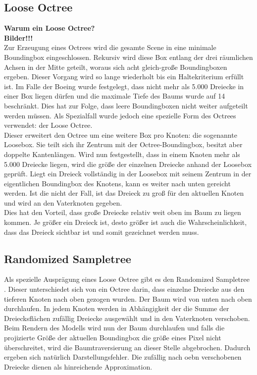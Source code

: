 \subsection{Loose Octree}
\label{basics:octree}
\textbf{Warum ein Loose Octree?}\\
\textbf{Bilder!!!}\\
Zur Erzeugung eines Octrees \cite{RTR3} wird die gesamte Scene in eine minimale Boundingbox eingeschlossen. Rekursiv wird diese Box entlang der drei räumlichen Achsen in der Mitte geteilt, woraus sich acht gleich-große Boundingboxen ergeben. Dieser Vorgang wird so lange wiederholt bis ein Haltekriterium erfüllt ist. Im Falle der Boeing wurde festgelegt, dass nicht mehr als 5.000 Dreiecke in einer Box liegen dürfen und die maximale Tiefe des Baums wurde auf 14 beschränkt. Dies hat zur Folge, dass leere Boundingboxen nicht weiter aufgeteilt werden müssen. Als Spezialfall wurde jedoch eine spezielle Form des Octrees verwendet: der Loose Octree.\\
Dieser erweitert den Octree um eine weitere Box pro Knoten: die sogenannte Loosebox. Sie teilt sich ihr Zentrum mit der Octree-Boundingbox, besitzt aber doppelte Kantenlängen. Wird nun festgestellt, dass in einem Knoten mehr als 5.000 Dreiecke liegen, wird die größe der einzelnen Dreiecke anhand der Loosebox geprüft. Liegt ein Dreieck vollständig in der Loosebox mit seinem Zentrum in der eigentlichen Boundingbox des Knotens, kann es weiter nach unten gereicht werden. Ist die nicht der Fall, ist das Dreieck zu groß für den aktuellen Knoten und wird an den Vaterknoten gegeben.\\
Dies hat den Vorteil, dass große Dreiecke relativ weit oben im Baum zu liegen kommen. Je größer ein Dreieck ist, desto größer ist auch die Wahrscheinlichkeit, dass das Dreieck sichtbar ist und somit gezeichnet werden muss.
\subsection{Randomized Sampletree}
\label{basics:sampletree}
Als spezielle Ausprägung eines Loose Octree gibt es den Randomized Sampletree \cite{klein}. Dieser unterschiedet sich von ein Octree darin, dass einzelne Dreiecke aus den tieferen Knoten nach oben gezogen wurden. Der Baum wird von unten nach oben durchlaufen. In jedem Knoten werden in Abhängigkeit der die Summe der Dreiecksflächen zufällig Dreiecke ausgewählt und in den Vaterknoten verschoben. Beim Rendern des Modells wird nun der Baum durchlaufen und falls die projizierte Größe der aktuellen Boundingbox die größe eines Pixel nicht überschreitet, wird die Baumtraversierung an dieser Stelle abgebrochen. Dadurch ergeben sich natürlich Darstellungsfehler. Die zufällig nach oebn verschobenen Dreiecke dienen als hinreichende Approximation.

